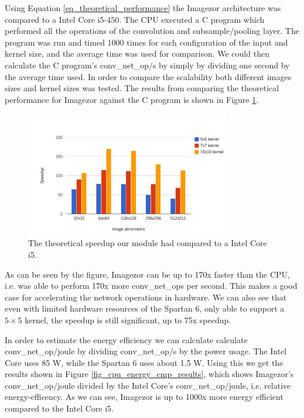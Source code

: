 Using Equation \ref{eq_theoretical_performance} the Imagezor architecture was  compared  to a Intel Core i5-450. The CPU executed a C program which performed all the operations of the convolution and subsample/pooling layer. The program was run and timed 1000 times for each configuration of the input and kernel size, and the average time was used for comparison. We could then calculate the C program's conv\_net\_op/s by simply by dividing one second by the average time used.  In order to compare the scalability both different images sizes and kernel sizes was tested. The results from comparing the theoretical performance for Imagezor against the C program is shown in Figure \ref{fig_cpu_cmp_results}.
\begin{figure}
  \centering
      \includegraphics[width=0.8\textwidth]{Figures/Results/Speedup_chart}
  \caption[Speedup]{The theoretical speedup our module had compared to a Intel Core i5.}
  \label{fig_cpu_cmp_results}
\end{figure}

As can be seen by the figure, Imagezor can be up to 170x faster than the CPU, i.e. was able to perform 170x more conv\_net\_ops per second. This makes a good case for accelerating the network operations in hardware. We can also see that even with limited hardware resources of the Spartan 6, only able to support a $ 5 \times 5 $ kernel, the speedup is still significant, up to 75x speedup.


In order to estimate the energy efficiency we can calculate calculate conv\_net\_op/joule by dividing conv\_net\_op/s by the power usage. The Intel Core uses 85 W, while the Spartan 6 uses about 1.5 W. Using this we get the results shown in Figure \ref{fig_cpu_energy_cmp_results}, which shows Imagezor's conv\_net\_op/joule divided by the Intel Core's conv\_net\_op/joule, i.e. relative energy-efficency. As we can see, Imagezor is up to 1000x more energy efficient compared to the Intel Core i5. 

